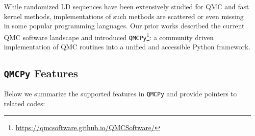 \documentclass[acmsmall]{acmart}
\begin{document}
While randomized LD sequences have been extensively studied for QMC and fast kernel methods, implementations of such methods are scattered or even missing in some popular programming languages. Our prior works \citep{choi.QMC_software,choi.challenges_great_qmc_software,hickernell2025quasi,sorokin.MC_vector_functions_integrals} described the current QMC software landscape and introduced \texttt{QMCPy}\footnote{\label{url:qmcpy}\url{https://qmcsoftware.github.io/QMCSoftware/}}: a community driven implementation of QMC routines into a unified and accessible Python framework.  

\subsection{\texttt{QMCPy} Features}

Below we summarize the supported features in \texttt{QMCPy} and provide pointers to related codes:
\end{document}
